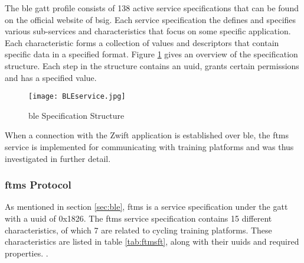The \ac{ble} \ac{gatt} profile consists of 138 active service specifications that can be found on the official website of \ac{bsig}. Each service specification the defines and specifies various sub-services and characteristics that focus on some specific application. Each characteristic forms a collection of values and descriptors that contain specific data in a specified format. Figure \ref{fig:serv} gives an overview of the specification structure. Each step in the structure contains an \ac{uuid}, grants certain permissions and has a specified value. \citep{BLSIG:2017}

\vspace{-0.3 cm}

\begin{figure}[H]
	\begin{center}
		\texttt{[image: BLEservice.jpg]}
		\caption{\ac{ble} Specification Structure}
		\label{fig:serv}
		\citep[Adapted from ][chap.~4]{Townsend:2014}
	\end{center}
\end{figure}

\vspace{-0.7 cm}

When a connection with the Zwift application is established over \ac{ble}, the \ac{ftms} service is implemented for communicating with training platforms and was thus investigated in further detail.

\subsubsection{\ac{ftms} Protocol}\label{sec:ftms}

As mentioned in section \ref{sec:ble}, \acf{ftms} is a service specification under the \acf{gatt} with a \ac{uuid} of 0x1826. The \ac{ftms} service specification contains 15 different characteristics, of which 7 are related to cycling training platforms. These characteristics are listed in table \ref{tab:ftmsft}, along with their \acp{uuid} and required properties. \cite[section ~4.9]{BLSIG:2017}.



